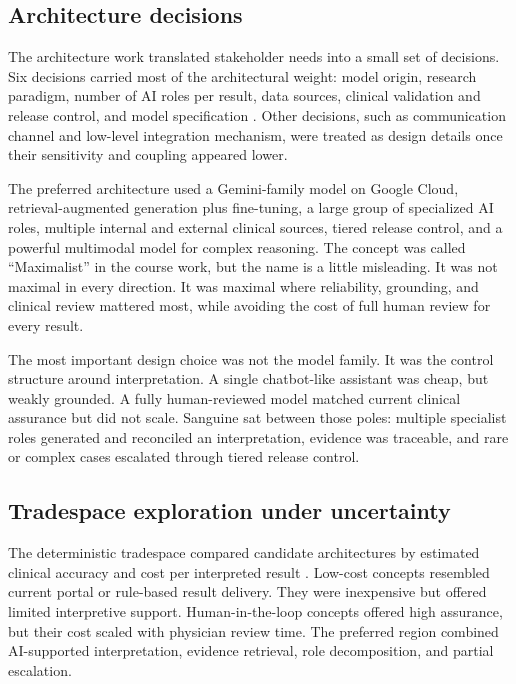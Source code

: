 \subsection{Architecture decisions}

The architecture work translated stakeholder needs into a small set of decisions. Six decisions carried most of the architectural weight: model origin, research paradigm, number of AI roles per result, data sources, clinical validation and release control, and model specification \cite{sanguine_os13}. Other decisions, such as communication channel and low-level integration mechanism, were treated as design details once their sensitivity and coupling appeared lower.

The preferred architecture used a Gemini-family model on Google Cloud, retrieval-augmented generation plus fine-tuning, a large group of specialized AI roles, multiple internal and external clinical sources, tiered release control, and a powerful multimodal model for complex reasoning. The concept was called ``Maximalist'' in the course work, but the name is a little misleading. It was not maximal in every direction. It was maximal where reliability, grounding, and clinical review mattered most, while avoiding the cost of full human review for every result.

The most important design choice was not the model family. It was the control structure around interpretation. A single chatbot-like assistant was cheap, but weakly grounded. A fully human-reviewed model matched current clinical assurance but did not scale. Sanguine sat between those poles: multiple specialist roles generated and reconciled an interpretation, evidence was traceable, and rare or complex cases escalated through tiered release control.

\subsection{Tradespace exploration under uncertainty}

The deterministic tradespace compared candidate architectures by estimated clinical accuracy and cost per interpreted result \cite{sanguine_os13}. Low-cost concepts resembled current portal or rule-based result delivery. They were inexpensive but offered limited interpretive support. Human-in-the-loop concepts offered high assurance, but their cost scaled with physician review time. The preferred region combined AI-supported interpretation, evidence retrieval, role decomposition, and partial escalation.

